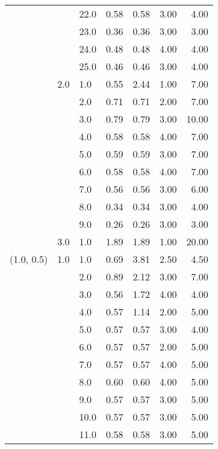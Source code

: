 \begin{tabular}{lllrrrr}
           &     & 22.0 &       0.58 &      0.58 & 3.00 &   4.00 \\
           &     & 23.0 &       0.36 &      0.36 & 3.00 &   3.00 \\
           &     & 24.0 &       0.48 &      0.48 & 4.00 &   4.00 \\
           &     & 25.0 &       0.46 &      0.46 & 3.00 &   4.00 \\
           & 2.0 & 1.0  &       0.55 &      2.44 & 1.00 &   7.00 \\
           &     & 2.0  &       0.71 &      0.71 & 2.00 &   7.00 \\
           &     & 3.0  &       0.79 &      0.79 & 3.00 &  10.00 \\
           &     & 4.0  &       0.58 &      0.58 & 4.00 &   7.00 \\
           &     & 5.0  &       0.59 &      0.59 & 3.00 &   7.00 \\
           &     & 6.0  &       0.58 &      0.58 & 4.00 &   7.00 \\
           &     & 7.0  &       0.56 &      0.56 & 3.00 &   6.00 \\
           &     & 8.0  &       0.34 &      0.34 & 3.00 &   4.00 \\
           &     & 9.0  &       0.26 &      0.26 & 3.00 &   3.00 \\
           & 3.0 & 1.0  &       1.89 &      1.89 & 1.00 &  20.00 \\
(1.0, 0.5) & 1.0 & 1.0  &       0.69 &      3.81 & 2.50 &   4.50 \\
           &     & 2.0  &       0.89 &      2.12 & 3.00 &   7.00 \\
           &     & 3.0  &       0.56 &      1.72 & 4.00 &   4.00 \\
           &     & 4.0  &       0.57 &      1.14 & 2.00 &   5.00 \\
           &     & 5.0  &       0.57 &      0.57 & 3.00 &   4.00 \\
           &     & 6.0  &       0.57 &      0.57 & 2.00 &   5.00 \\
           &     & 7.0  &       0.57 &      0.57 & 4.00 &   5.00 \\
           &     & 8.0  &       0.60 &      0.60 & 4.00 &   5.00 \\
           &     & 9.0  &       0.57 &      0.57 & 3.00 &   5.00 \\
           &     & 10.0 &       0.57 &      0.57 & 3.00 &   5.00 \\
           &     & 11.0 &       0.58 &      0.58 & 3.00 &   5.00 \\

\end{tabular}
